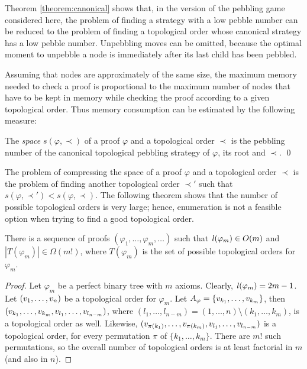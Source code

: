 \noindent
Theorem \ref{theorem:canonical} shows that, in the version of the pebbling game considered here, the problem of finding a strategy with a low pebble number can be reduced to the problem of finding a topological order whose canonical strategy has a low pebble number. Unpebbling moves can be omitted, because the optimal moment to unpebble a node is immediately after its last child has been pebbled.

Assuming that nodes are approximately of the same size, the maximum memory needed to check a proof is proportional to the maximum number of nodes that have to be kept in memory while checking the proof according to a given topological order. Thus memory consumption can be estimated by the following measure:

\newcommand{\pspace}[2]{s(#1,#2)}
\begin{definition}[Space]
\label{def:space measure}
The \emph{space} $\pspace{\varphi}{\prec}$ 
of a proof $\varphi$ and a topological order $\prec$ is the pebbling number of the canonical topological pebbling strategy of $\varphi$, its root and $\prec$.
\qed
\end{definition}

\noindent
The problem of compressing the space of a proof $\varphi$ and a topological order $\prec$ is the problem of finding another topological order $\prec'$ such that $\pspace{\varphi}{\prec'} < \pspace{\varphi}{\prec}$. The following theorem shows that the number of possible topological orders is very large; hence, enumeration is not a feasible option when trying to find a good topological order.

\begin{theorem}
\label{theorem:enumeration}
There is a sequence of proofs $(\varphi_1,\ldots,\varphi_m,\ldots)$ such that $\mathit{l}(\varphi_m) \in O(m)$ and $|T(\varphi_m)| \in \Omega(m!)$, where $T(\varphi_m)$ is the set of possible topological orders for $\varphi_m$.
\end{theorem}
\begin{proof}
Let $\varphi_m$ be a perfect binary tree with $m$ axioms. Clearly, $\mathit{l}(\varphi_m) = 2m-1$.
Let $(v_1,\ldots,v_n)$ be a topological order for $\varphi_m$. 
Let $A_{\varphi} = \{v_{k_1},\ldots,v_{k_m}\}$, then $(v_{k_1},\ldots,v_{k_m},v_{l_1},\ldots,v_{l_{n-m}})$, where $(l_1,\ldots,l_{n-m}) = (1,\ldots,n) \setminus (k_1,\ldots,k_m)$, is a topological order as well. 
Likewise, $(v_{\pi({k_1})},\ldots,v_{\pi({k_m})},v_{l_1},\ldots,v_{l_{n-m}})$ is a topological order, for every permutation $\pi$ of $\{k_1,\ldots,k_m\}$. There are $m!$ such permutations, so the overall number of topological orders is at least factorial in $m$ (and also in $n$).
\end{proof}


